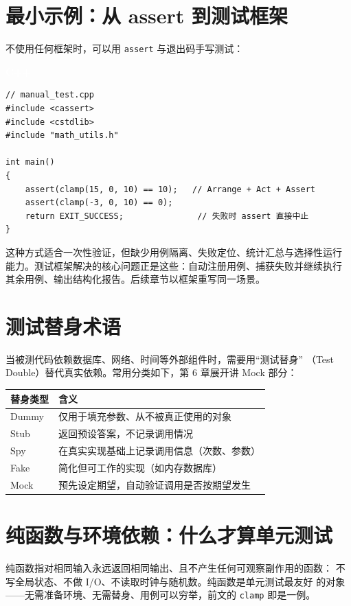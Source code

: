 \documentclass[12pt,a4paper,fontset=fandol]{ctexbook}
\newcommand{\cpplabel}{%
  \begin{tcolorbox}[enhanced,colback=cppheadbg,colframe=cppheadbg,
    arc=1mm,boxrule=0mm,left=6pt,right=6pt,top=2pt,bottom=2pt,
    halign=left,oversize]
    \textcolor{white}{\small\bfseries C++}
  \end{tcolorbox}\vspace{-4pt}}
\begin{document}
\section{最小示例：从 assert 到测试框架}

不使用任何框架时，可以用 \texttt{assert} 与退出码手写测试：

\cpplabel
\begin{lstlisting}
// manual_test.cpp
#include <cassert>
#include <cstdlib>
#include "math_utils.h"

int main()
{
    assert(clamp(15, 0, 10) == 10);   // Arrange + Act + Assert
    assert(clamp(-3, 0, 10) == 0);
    return EXIT_SUCCESS;               // 失败时 assert 直接中止
}
\end{lstlisting}

这种方式适合一次性验证，但缺少用例隔离、失败定位、统计汇总与选择性运行
能力。测试框架解决的核心问题正是这些：自动注册用例、捕获失败并继续执行
其余用例、输出结构化报告。后续章节以框架重写同一场景。

\section{测试替身术语}

当被测代码依赖数据库、网络、时间等外部组件时，需要用“测试替身”
（Test Double）替代真实依赖。常用分类如下，第 6 章展开讲 Mock 部分：

\begin{center}
\scriptsize
\setlength{\tabcolsep}{4pt}
\begin{tabular}{p{2.6cm}p{10.4cm}}
\toprule
替身类型 & 含义 \\
\midrule
Dummy & 仅用于填充参数、从不被真正使用的对象 \\
Stub & 返回预设答案，不记录调用情况 \\
Spy & 在真实实现基础上记录调用信息（次数、参数） \\
Fake & 简化但可工作的实现（如内存数据库） \\
Mock & 预先设定期望，自动验证调用是否按期望发生 \\
\bottomrule
\end{tabular}
\end{center}

\section{纯函数与环境依赖：什么才算单元测试}

纯函数指对相同输入永远返回相同输出、且不产生任何可观察副作用的函数：
不写全局状态、不做 I/O、不读取时钟与随机数。纯函数是单元测试最友好
的对象——无需准备环境、无需替身、用例可以穷举，前文的 \texttt{clamp}
即是一例。
\end{document}

